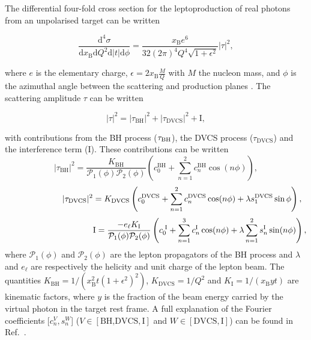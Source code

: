 The differential four-fold cross section for the leptoproduction of real photons
from an unpolarised target can be written \cite{Bel02b}
\begin{center}
\begin{equation}
\frac{\textrm{d}^4\sigma}{\textrm{d}x_{\textrm{B}}\textrm{d}Q^{2}\textrm{d}
|t|\textrm{d}\phi} =
\frac{x_{\textrm{B}}e^{6}}{32(2\pi)^{4} Q^{4}\sqrt{1+\epsilon^{2}}}
|\tau|^{2},
\end{equation}
\end{center}
where $e$ is the elementary
charge, $\epsilon=2x_\textrm{B}\frac{M}{Q}$ with $M$
the nucleon mass, and $\phi$ is the
azimuthal angle between the scattering and production planes \cite{Tre04}.
The scattering amplitude $\tau$ can be written
\begin{center}
\begin{equation}
|\tau|^{2} = |\tau_{\textrm{BH}}|^{2} +
|\tau_{\textrm{DVCS}}|^{2} + \textrm{I},
\end{equation}
\end{center}
with contributions from the \textrm{BH} process ($\tau_{\textrm{\textrm{BH}}}$),
the DVCS process
($\tau_{\textrm{DVCS}}$) and the interference term (I). These
contributions can be written 
\begin{equation}
 |\tau_{\textrm{BH}}|^{2} =
\frac{K_{\textrm{BH}}}{\mathcal{P}_{1}(\phi)\mathcal{P}_{2}(\phi)}
\left(c_{0}^{
\textrm{BH}} + \sum_{n=1}^2 c_{n}^{\textrm{BH}}\cos(n\phi)\right),
\label{e:tbh}
\end{equation}
\begin{equation}
 \hspace{2.2cm}|\tau_{\textrm{DVCS}}|^{2} =
K_{\textrm{DVCS}}\left(c_{0}^{\textrm{DVCS}} +
\sum_{n=1}^2
c_{n}^{\textrm{DVCS}}\cos(n\phi) + \lambda
s_{1}^{\textrm{DVCS}}\sin\phi\right),
\label{e:tdvcs}
\end{equation}
\begin{equation}
\hspace{3.7cm} \textrm{I} = \frac{- e_\ell
K_{\textrm{I}}}{\mathcal{P}_{1}(\phi)\mathcal{P}_{2}(\phi)}\left(c_{0}^{\textrm{
I}}
+
\sum_{n=1}^3 c_{n}^{\textrm{I}}\cos(n\phi) + \lambda \sum_{n=1}^2
s_{n}^{\textrm{I}}\sin(n\phi)\right),
\label{e:ti}
\end{equation}
where $\mathcal{P}_1(\phi)$ and $\mathcal{P}_2(\phi)$ are the lepton propagators
of the BH process and $\lambda$ and $e_\ell$ are respectively the
helicity and unit charge of the lepton beam.  The
quantities $K_{\textrm{BH}}=1/(x_\textrm{B}^2t(1+\epsilon^2)^2)$,
$K_{\textrm{DVCS}}=1/Q^2$
and $K_{\textrm{I}}=1/(x_{\textrm{B}}yt)$ are kinematic factors, where
$y$ is the fraction of the beam energy carried by the virtual photon in
the target rest frame. A full
explanation of the Fourier coefficients [$c_n^V,s_n^W$]
($V\in[\textrm{BH,DVCS},\textrm{I}]$ and $W\in[\textrm{DVCS},\textrm{I}]$) can be
found in
Ref.~\cite{Bel02b}.
 
